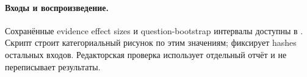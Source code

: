 \documentclass[11pt,a4paper]{article}
\begin{document}
\paragraph{Входы и воспроизведение.}
Сохранённые evidence effect sizes и question-bootstrap интервалы доступны
в . Скрипт
 строит категориальный рисунок по этим
значениям;  фиксирует hashes остальных входов.
Редакторская проверка использует отдельный отчёт и не переписывает результаты.
\end{document}
